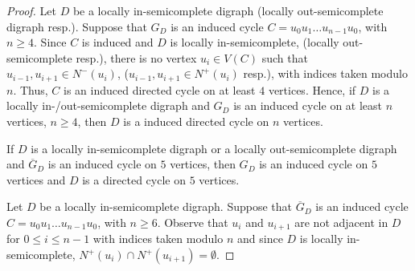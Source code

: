 \begin{proof}
Let $D$ be a locally in-semicomplete digraph (locally out-semicomplete digraph resp.). 
Suppose that $G_D$ is an induced cycle $C=u_0u_1\dots u_{n-1}u_0$, with $n\ge4$. Since $C$ is induced and $D$ is  locally in-semicomplete, (locally out-semicomplete resp.), 
there is no vertex $u_i\in V(C)$ such that $u_{i-1},u_{i+1}\in N^-(u_i)$, ($u_{i-1},u_{i+1}\in N^+(u_i)$ resp.), 
with indices taken modulo $n$. Thus, $C$ is an induced directed  cycle on at least $4$ vertices. Hence, if $D$ is a locally in-/out-semicomplete digraph and $G_D$  is an induced cycle on at least $n$ vertices, $n\ge4$, then $D$ is a induced directed cycle on $n$ vertices.

If $D$ is a locally in-semicomplete digraph or a locally out-semicomplete digraph and $\overline{G}_D$ is an induced cycle on $5$ vertices, then ${G}_D$ is an induced cycle on $5$ vertices and $D$ is a directed cycle on $5$ vertices. 

Let $D$ be a locally in-semicomplete digraph. Suppose that $\overline{G}_D$ is an induced cycle $C=u_0u_1\dots u_{n-1}u_0$, with $n\ge6$. Observe that $u_i$ and $u_{i+1}$ are not adjacent in $D$ for $0\le i\le n-1$ with indices taken modulo $n$ and since $D$ is locally in-semicomplete, $N^+(u_i)\cap N^+(u_{i+1})=\emptyset$. 


\end{proof}
